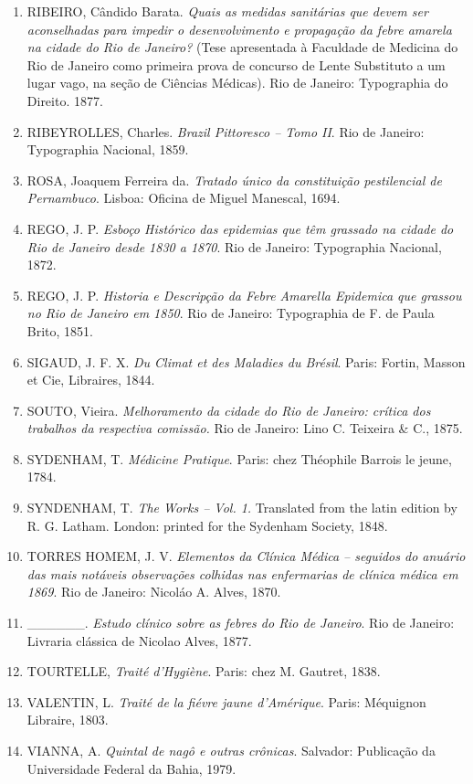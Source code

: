 \begin{enumerate}
{  a D. João de Sousa.} Lisboa: na oficina de João Galrao, 1683.
\item
  RIBEIRO, Cândido Barata. \emph{Quais as medidas sanitárias que devem
  ser aconselhadas para impedir o desenvolvimento e propagação da febre
  amarela na cidade do Rio de Janeiro?} (Tese apresentada à Faculdade de
  Medicina do Rio de Janeiro como primeira prova de concurso de Lente
  Substituto a um lugar vago, na seção de Ciências Médicas). Rio de
  Janeiro: Typographia do Direito. 1877.
\item
  RIBEYROLLES, Charles. \emph{Brazil Pittoresco -- Tomo II}. Rio de
  Janeiro: Typographia Nacional, 1859.
\item
  ROSA, Joaquem Ferreira da. \emph{Tratado único da constituição
  pestilencial de Pernambuco}. Lisboa: Oficina de Miguel Manescal, 1694.
\item
  REGO, J. P. \emph{Esboço Histórico das epidemias que têm grassado na
  cidade do Rio de Janeiro desde 1830 a 1870}. Rio de Janeiro:
  Typographia Nacional, 1872.
\item
  REGO, J. P. \emph{Historia e Descripção da Febre Amarella Epidemica
  que grassou no Rio de Janeiro em 1850}. Rio de Janeiro: Typographia de
  F. de Paula Brito, 1851.
\item
  SIGAUD, J. F. X. \emph{Du Climat et des Maladies du Brésil}. Paris:
  Fortin, Masson et Cie, Libraires, 1844.
\item
  SOUTO, Vieira. \emph{Melhoramento da cidade do Rio de Janeiro: crítica
  dos trabalhos da respectiva comissão.} Rio de Janeiro: Lino C.
  Teixeira \& C., 1875.
\item
  SYDENHAM, T. \emph{Médicine Pratique}. Paris: chez Théophile Barrois
  le jeune, 1784.
\item
  SYNDENHAM, T. \emph{The Works -- Vol. 1.} Translated from the latin
  edition by R. G. Latham. London: printed for the Sydenham Society,
  1848.
\item
  TORRES HOMEM, J. V. \emph{Elementos da Clínica Médica -- seguidos do
  anuário das mais notáveis observações colhidas nas enfermarias de
  clínica médica em 1869}. Rio de Janeiro: Nicoláo A. Alves, 1870.
\item
  \_\_\_\_\_\_. \emph{Estudo clínico sobre as febres do Rio de Janeiro}.
  Rio de Janeiro: Livraria clássica de Nicolao Alves, 1877.
\item
  TOURTELLE, \emph{Traité d'Hygiène}. Paris: chez M. Gautret, 1838.
\item
  VALENTIN, L. \emph{Traité de la fiévre jaune d'Amérique}. Paris:
  Méquignon Libraire, 1803.
\item
  VIANNA, A. \emph{Quintal de nagô e outras crônicas}. Salvador:
  Publicação da Universidade Federal da Bahia, 1979.
\end{enumerate}


